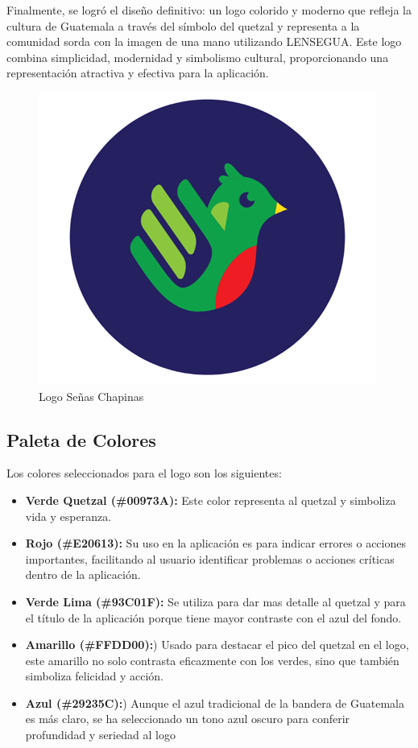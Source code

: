 Finalmente, se logró el diseño definitivo: un logo colorido y moderno que refleja la cultura de Guatemala a través del símbolo del quetzal y representa a la comunidad sorda con la imagen de una mano utilizando LENSEGUA. Este logo combina simplicidad, modernidad y simbolismo cultural, proporcionando una representación atractiva y efectiva para la aplicación. 


\begin{figure} [H]
    \centering
    \includegraphics[width=0.4\linewidth]{figuras/logo_final.png}
    \caption{Logo Señas Chapinas}
    \label{fig:enter-label}
\end{figure}




\subsection{Paleta de Colores}


Los colores seleccionados para el logo son los siguientes:


\begin{itemize}
    
    \item \textbf{Verde Quetzal (\#00973A):} Este color representa al quetzal y simboliza vida y esperanza. 
       
    \item \textbf{Rojo (\#E20613):}  Su uso en la aplicación es para indicar errores o acciones importantes, facilitando al usuario identificar problemas o acciones críticas dentro de la aplicación.

    \item \textbf{Verde Lima (\#93C01F):} Se utiliza para dar mas detalle al quetzal y para el título de la aplicación porque tiene mayor contraste con el azul del fondo. 
    
    \item \textbf{Amarillo (\#FFDD00):}) Usado para destacar el pico del quetzal en el logo, este amarillo no solo contrasta eficazmente con los verdes, sino que también simboliza felicidad y acción. 

    \item \textbf{Azul (\#29235C):}) Aunque el azul tradicional de la bandera de Guatemala es más claro, se ha seleccionado un tono azul oscuro para conferir profundidad y seriedad al logo
    
\end{itemize}

